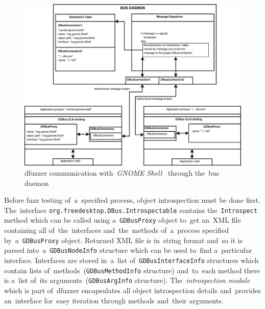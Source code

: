 \begin{figure}[h]
\centering
\caption{dfuzzer communication with~\emph{GNOME Shell}~\cite{GNOMEShell}
		through the~bus daemon}
\label{fig:dfuzzer_image}
\includegraphics[width=1\textwidth]{fig/dfuzzer_diagram.eps}
\end{figure}


Before fuzz testing of~a~specified process, object introspection must be done
first. The~interface \texttt{org.freedesktop.DBus.Introspectable} contains
the~\texttt{Introspect} method which can be called using a~\texttt{GDBusProxy} object
to~get an~XML file containing all of~the~interfaces and~the~methods of~a~process
specified by~a~\texttt{GDBusProxy} object. Returned XML file is in~string format
and~so it is parsed into~a~\texttt{GDBusNodeInfo} structure which can be used
to~find a~particular interface. Interfaces are stored in~a~list
of~\texttt{GDBusInterfaceInfo} structures which contain lists
of~methods~(\texttt{GDBusMethodInfo} structure) and~to~each method there is a~list
of~its arguments~(\texttt{GDBusArgInfo} structure). The~\emph{introspection module}
which is part of~dfuzzer encapsulates all object introspection details and~provides
an~interface for~easy iteration through methods and~their arguments.\\


